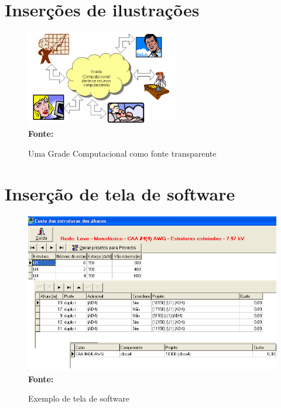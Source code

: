 \section{\esp Inserções de ilustrações}

\begin{figure}[ht]
	\centering	
	\caption[\hspace{0.1cm}Grade Computacional.]{Uma Grade Computacional como fonte transparente}
	\vspace{-0.4cm}
	\includegraphics[width=0.6\textwidth]{figuras/grade-comp.png}
	\\\textbf{\footnotesize Fonte:  }
	\label{fig:figura1}
\end{figure}
\vspace{-0.5cm}

\section{\esp Inserção de tela de software}

\begin{figure}[!ht]
	\centering	
	\caption[\hspace{0.1cm}Exemplo de tela de software.]{Exemplo de tela de software}
	\includegraphics[width=.8\textwidth]{figuras/tela1.png}
	\\\textbf{\footnotesize Fonte: }
	\label{fig:tela1}
\end{figure}


